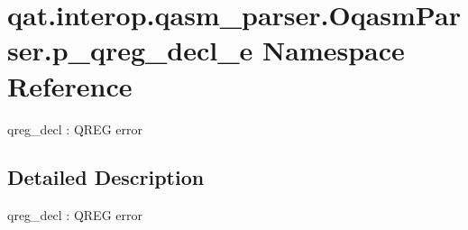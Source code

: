 \hypertarget{namespaceqat_1_1interop_1_1qasm__parser_1_1OqasmParser_1_1p__qreg__decl__e}{\section{qat.\-interop.\-qasm\-\_\-parser.\-Oqasm\-Parser.\-p\-\_\-qreg\-\_\-decl\-\_\-e Namespace Reference}
\label{namespaceqat_1_1interop_1_1qasm__parser_1_1OqasmParser_1_1p__qreg__decl__e}
}


qreg\-\_\-decl \-: Q\-R\-E\-G error  




\subsection{Detailed Description}
qreg\-\_\-decl \-: Q\-R\-E\-G error 